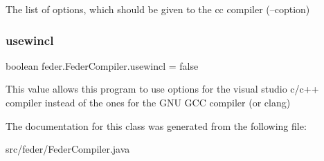The list of options, which should be given to the cc compiler (--coption) \mbox{\label{classfeder_1_1FederCompiler_aa2d3d96c99a1a600acdcdc5c0fc3910e}} 
\subsubsection{\texorpdfstring{usewincl}{usewincl}}
{\footnotesize\ttfamily boolean feder.\+Feder\+Compiler.\+usewincl = false}

This value allows this program to use options for the visual studio c/c++ compiler instead of the ones for the G\+NU G\+CC compiler (or clang) 

The documentation for this class was generated from the following file\+:\begin{DoxyCompactItemize}
\item 
src/feder/Feder\+Compiler.\+java\end{DoxyCompactItemize}

